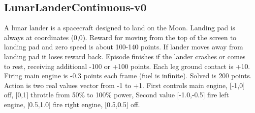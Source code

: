 \documentclass[11pt]{article}
\begin{document}
\subsection{LunarLanderContinuous-v0}
A lunar lander is a spacecraft designed to land on the Moon. Landing pad is always at coordinates
(0,0). Reward for moving from the top of the screen to landing pad and zero speed is about 100-140
points. If lander moves away from landing pad it loses reward back. Episode finishes if the lander
crashes or comes to rest, receiving additional -100 or +100 points. Each leg ground contact is +10.
Firing main engine is -0.3 points each frame (fuel is infinite). Solved is 200 points. Action is two
real values vector from -1 to +1. First controls main engine, [-1,0] off, [0,1] throttle from 50\%
to 100\% power, Second value [-1.0,-0.5] fire left engine, [0.5,1.0] fire right engine, [0.5,0.5]
off.
\end{document}
